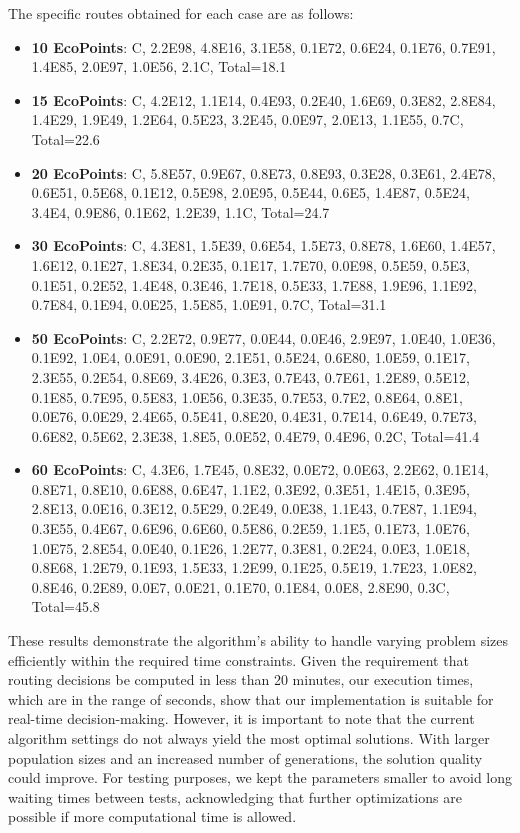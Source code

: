 The specific routes obtained for each case are as follows:

\begin{itemize}
    \item \textbf{10 EcoPoints}: C, 2.2E98, 4.8E16, 3.1E58, 0.1E72, 0.6E24, 0.1E76, 0.7E91, 1.4E85, 2.0E97, 1.0E56, 2.1C, Total=18.1
    \item \textbf{15 EcoPoints}: C, 4.2E12, 1.1E14, 0.4E93, 0.2E40, 1.6E69, 0.3E82, 2.8E84, 1.4E29, 1.9E49, 1.2E64, 0.5E23, 3.2E45, 0.0E97, 2.0E13, 1.1E55, 0.7C, Total=22.6
    \item \textbf{20 EcoPoints}: C, 5.8E57, 0.9E67, 0.8E73, 0.8E93, 0.3E28, 0.3E61, 2.4E78, 0.6E51, 0.5E68, 0.1E12, 0.5E98, 2.0E95, 0.5E44, 0.6E5, 1.4E87, 0.5E24, 3.4E4, 0.9E86, 0.1E62, 1.2E39, 1.1C, Total=24.7
    \item \textbf{30 EcoPoints}: C, 4.3E81, 1.5E39, 0.6E54, 1.5E73, 0.8E78, 1.6E60, 1.4E57, 1.6E12, 0.1E27, 1.8E34, 0.2E35, 0.1E17, 1.7E70, 0.0E98, 0.5E59, 0.5E3, 0.1E51, 0.2E52, 1.4E48, 0.3E46, 1.7E18, 0.5E33, 1.7E88, 1.9E96, 1.1E92, 0.7E84, 0.1E94, 0.0E25, 1.5E85, 1.0E91, 0.7C, Total=31.1
    \item \textbf{50 EcoPoints}: C, 2.2E72, 0.9E77, 0.0E44, 0.0E46, 2.9E97, 1.0E40, 1.0E36, 0.1E92, 1.0E4, 0.0E91, 0.0E90, 2.1E51, 0.5E24, 0.6E80, 1.0E59, 0.1E17, 2.3E55, 0.2E54, 0.8E69, 3.4E26, 0.3E3, 0.7E43, 0.7E61, 1.2E89, 0.5E12, 0.1E85, 0.7E95, 0.5E83, 1.0E56, 0.3E35, 0.7E53, 0.7E2, 0.8E64, 0.8E1, 0.0E76, 0.0E29, 2.4E65, 0.5E41, 0.8E20, 0.4E31, 0.7E14, 0.6E49, 0.7E73, 0.6E82, 0.5E62, 2.3E38, 1.8E5, 0.0E52, 0.4E79, 0.4E96, 0.2C, Total=41.4
    \item \textbf{60 EcoPoints}: C, 4.3E6, 1.7E45, 0.8E32, 0.0E72, 0.0E63, 2.2E62, 0.1E14, 0.8E71, 0.8E10, 0.6E88, 0.6E47, 1.1E2, 0.3E92, 0.3E51, 1.4E15, 0.3E95, 2.8E13, 0.0E16, 0.3E12, 0.5E29, 0.2E49, 0.0E38, 1.1E43, 0.7E87, 1.1E94, 0.3E55, 0.4E67, 0.6E96, 0.6E60, 0.5E86, 0.2E59, 1.1E5, 0.1E73, 1.0E76, 1.0E75, 2.8E54, 0.0E40, 0.1E26, 1.2E77, 0.3E81, 0.2E24, 0.0E3, 1.0E18, 0.8E68, 1.2E79, 0.1E93, 1.5E33, 1.2E99, 0.1E25, 0.5E19, 1.7E23, 1.0E82, 0.8E46, 0.2E89, 0.0E7, 0.0E21, 0.1E70, 0.1E84, 0.0E8, 2.8E90, 0.3C, Total=45.8
\end{itemize}

These results demonstrate the algorithm's ability to handle varying problem sizes efficiently within the required time constraints.
Given the requirement that routing decisions be computed in less than 20 minutes, our execution times, which are in the range of seconds, show that our implementation is suitable for real-time decision-making.
However, it is important to note that the current algorithm settings do not always yield the most optimal solutions.
With larger population sizes and an increased number of generations, the solution quality could improve.
For testing purposes, we kept the parameters smaller to avoid long waiting times between tests, acknowledging that further optimizations are possible if more computational time is allowed.



